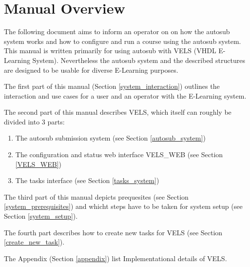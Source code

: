 \section{Manual Overview} \label{overview}

The following document aims to inform an operator on on how the autosub system works
and how to configure and run a course using the autosub system. This manual is written
primarily for using autosub with VELS (VHDL E-Learning System). Nevertheless the autosub
system and the described structures are designed to be usable for diverse E-Learning
purposes.

The first part of this manual (Section \ref{system_interaction}) outlines the
interaction and use cases for a user and an operator with the E-Learning system.

The second part of this manual describes VELS, which itself can roughly be divided
into 3 parts:
\begin{enumerate}
    \item The autosub submission system (see Section \ref{autosub_system})
    \item The configuration and status web interface VELS\_WEB (see Section
	      \ref{VELS_WEB})
    \item The tasks interface (see Section \ref{tasks_system})
\end{enumerate}

The third part of this manual depicts prequesites (see Section \ref{system_prerequisites})
and whicht steps have to be taken for system setup (see Section \ref{system_setup}).

The fourth part describes how to create new tasks for VELS (see Section \ref{create_new_task}).

The Appendix (Section \ref{appendix}) list Implementational details of VELS.
